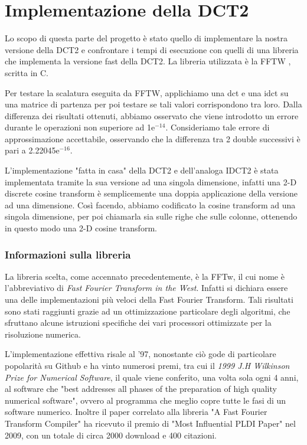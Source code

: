 	
\part{Implementazione della DCT2}

Lo scopo di questa parte del progetto è stato quello di implementare la nostra versione della DCT2 e confrontare i tempi di esecuzione con quelli di una libreria che implementa la versione fast della DCT2. La libreria utilizzata è la FFTW \cite{fftw}, scritta in C.

Per testare la scalatura eseguita da FFTW, applichiamo una dct e una idct su una matrice di partenza per poi testare se tali valori corrispondono tra loro. Dalla differenza dei risultati ottenuti, abbiamo osservato che viene introdotto un errore durante le operazioni non superiore ad 1e$^{-14}$. Consideriamo tale errore di approssimazione accettabile, osservando che la differenza tra 2 double successivi è pari a 2.22045e$^{-16}$.

L'implementazione "fatta in casa" della DCT2 e dell'analoga IDCT2 è stata implementata tramite la sua versione ad una singola dimensione, infatti una 2-D discrete cosine transform è semplicemente una doppia applicazione della versione ad una dimensione. Così facendo, abbiamo codificato la cosine transform ad una singola dimensione, per poi chiamarla sia sulle righe che sulle colonne, ottenendo in questo modo una 2-D cosine transform.

\section{Informazioni sulla libreria}

La libreria scelta, come accennato precedentemente, è la FFTw, il cui nome è l'abbreviativo di \textit{Fast Fourier Transform in the West}. Infatti si dichiara essere una delle implementazioni più veloci della Fast Fourier Transform. Tali risultati sono stati raggiunti grazie ad un ottimizzazione particolare degli algoritmi, che sfruttano alcune istruzioni specifiche dei vari processori ottimizzate per la risoluzione numerica.

L'implementazione effettiva risale al '97, nonostante ciò gode di particolare popolarità su Github\cite{Github} e ha vinto numerosi premi, tra cui il \textit{1999 J.H Wilkinson Prize for Numerical Software}, il quale viene conferito, una volta sola ogni 4 anni, al software che "best addresses all phases of the preparation of high quality numerical software", ovvero al programma che meglio copre tutte le fasi di un software numerico. Inoltre il paper correlato alla libreria "A Fast Fourier Transform Compiler"\cite{fftw_paper} ha ricevuto il premio di "Most Influential PLDI Paper" nel 2009, con un totale di circa 2000 download e 400 citazioni.

